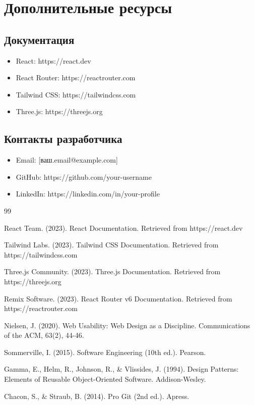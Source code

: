 \documentclass[12pt,a4paper]{report}
\begin{document}
\chapter{Дополнительные ресурсы}

\section{Документация}
\begin{itemize}
    \item React: https://react.dev
    \item React Router: https://reactrouter.com
    \item Tailwind CSS: https://tailwindcss.com
    \item Three.js: https://threejs.org
\end{itemize}

\section{Контакты разработчика}
\begin{itemize}
    \item Email: [ваш.email@example.com]
    \item GitHub: https://github.com/your-username
    \item LinkedIn: https://linkedin.com/in/your-profile
\end{itemize}

\begin{thebibliography}{99}

 React Team. (2023). React Documentation. Retrieved from https://react.dev

 Tailwind Labs. (2023). Tailwind CSS Documentation. Retrieved from https://tailwindcss.com

 Three.js Community. (2023). Three.js Documentation. Retrieved from https://threejs.org

 Remix Software. (2023). React Router v6 Documentation. Retrieved from https://reactrouter.com

 Nielsen, J. (2020). Web Usability: Web Design as a Discipline. Communications of the ACM, 63(2), 44-46.

 Sommerville, I. (2015). Software Engineering (10th ed.). Pearson.

 Gamma, E., Helm, R., Johnson, R., \& Vlissides, J. (1994). Design Patterns: Elements of Reusable Object-Oriented Software. Addison-Wesley.

 Chacon, S., \& Straub, B. (2014). Pro Git (2nd ed.). Apress.

\end{thebibliography}
\end{document}
